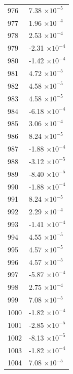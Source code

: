 \documentclass[a4paper,11pt]{article}
\begin{document}
\begin{center}
\begin{longtable}{|R{1.5cm}|R{2.5cm}|}
  976 &         7.38 $\times 10^{          -5}$ \\
  977 &         1.96 $\times 10^{          -4}$ \\
  978 &         2.53 $\times 10^{          -4}$ \\
  979 &        -2.31 $\times 10^{          -4}$ \\
  980 &        -1.42 $\times 10^{          -4}$ \\
  981 &         4.72 $\times 10^{          -5}$ \\
  982 &         4.58 $\times 10^{          -5}$ \\
  983 &         4.58 $\times 10^{          -5}$ \\
  984 &        -6.18 $\times 10^{          -4}$ \\
  985 &         3.06 $\times 10^{          -4}$ \\
  986 &         8.24 $\times 10^{          -5}$ \\
  987 &        -1.88 $\times 10^{          -4}$ \\
  988 &        -3.12 $\times 10^{          -5}$ \\
  989 &        -8.40 $\times 10^{          -5}$ \\
  990 &        -1.88 $\times 10^{          -4}$ \\
  991 &         8.24 $\times 10^{          -5}$ \\
  992 &         2.29 $\times 10^{          -4}$ \\
  993 &        -1.41 $\times 10^{          -4}$ \\
  994 &         4.55 $\times 10^{          -5}$ \\
  995 &         4.57 $\times 10^{          -5}$ \\
  996 &         4.57 $\times 10^{          -5}$ \\
  997 &        -5.87 $\times 10^{          -4}$ \\
  998 &         2.75 $\times 10^{          -4}$ \\
  999 &         7.08 $\times 10^{          -5}$ \\
 1000 &        -1.82 $\times 10^{          -4}$ \\
 1001 &        -2.85 $\times 10^{          -5}$ \\
 1002 &        -8.13 $\times 10^{          -5}$ \\
 1003 &        -1.82 $\times 10^{          -4}$ \\
 1004 &         7.08 $\times 10^{          -5}$ \\

\end{longtable}
\end{center}
\end{document}
